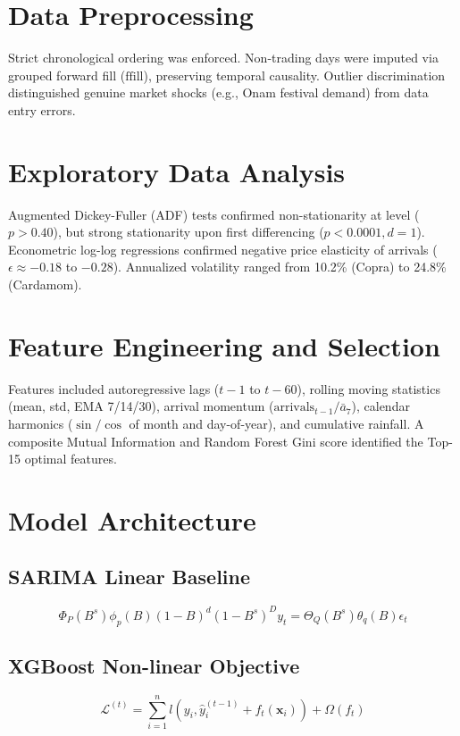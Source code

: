 \documentclass[journal,10pt,twocolumn]{IEEEtran}
\begin{document}
\section{Data Preprocessing}
Strict chronological ordering was enforced. Non-trading days were imputed via grouped forward fill ($\text{ffill}$), preserving temporal causality. Outlier discrimination distinguished genuine market shocks (e.g., Onam festival demand) from data entry errors.

\section{Exploratory Data Analysis}
Augmented Dickey-Fuller (ADF) tests confirmed non-stationarity at level ($p > 0.40$), but strong stationarity upon first differencing ($p < 0.0001, d=1$). Econometric log-log regressions confirmed negative price elasticity of arrivals ($\epsilon \approx -0.18$ to $-0.28$). Annualized volatility ranged from 10.2\% (Copra) to 24.8\% (Cardamom).

\section{Feature Engineering and Selection}
Features included autoregressive lags ($t-1$ to $t-60$), rolling moving statistics (mean, std, EMA 7/14/30), arrival momentum ($\text{arrivals}_{t-1}/\bar{a}_7$), calendar harmonics ($\sin/\cos$ of month and day-of-year), and cumulative rainfall. A composite Mutual Information and Random Forest Gini score identified the Top-15 optimal features.

\section{Model Architecture}
\subsection{SARIMA Linear Baseline}
\begin{equation}
\Phi_P(B^s)\phi_p(B)(1-B)^d(1-B^s)^D y_t = \Theta_Q(B^s)\theta_q(B)\epsilon_t
\end{equation}
\subsection{XGBoost Non-linear Objective}
\begin{equation}
\mathcal{L}^{(t)} = \sum_{i=1}^n l\left(y_i, \hat{y}_i^{(t-1)} + f_t(\mathbf{x}_i)\right) + \Omega(f_t)
\end{equation}
\end{document}
